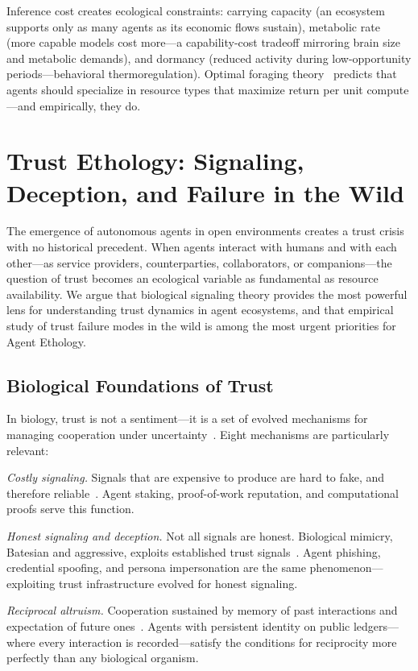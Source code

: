 \documentclass[letterpaper]{article}
\begin{document}
Inference cost creates ecological constraints: carrying capacity (an ecosystem supports only as many agents as its economic flows sustain), metabolic rate (more capable models cost more---a capability-cost tradeoff mirroring brain size and metabolic demands), and dormancy (reduced activity during low-opportunity periods---behavioral thermoregulation). Optimal foraging theory~\citep{stephens1986foraging} predicts that agents should specialize in resource types that maximize return per unit compute---and empirically, they do.

\section{Trust Ethology: Signaling, Deception, and Failure in the Wild}

The emergence of autonomous agents in open environments creates a trust crisis with no historical precedent. When agents interact with humans and with each other---as service providers, counterparties, collaborators, or companions---the question of trust becomes an ecological variable as fundamental as resource availability. We argue that biological signaling theory provides the most powerful lens for understanding trust dynamics in agent ecosystems, and that empirical study of trust failure modes in the wild is among the most urgent priorities for Agent Ethology.

\subsection{Biological Foundations of Trust}

In biology, trust is not a sentiment---it is a set of evolved mechanisms for managing cooperation under uncertainty~\citep{searcy2005evolution}. Eight mechanisms are particularly relevant:

\emph{Costly signaling.} Signals that are expensive to produce are hard to fake, and therefore reliable~\citep{zahavi1975mate}. Agent staking, proof-of-work reputation, and computational proofs serve this function.

\emph{Honest signaling and deception.} Not all signals are honest. Biological mimicry, Batesian and aggressive, exploits established trust signals~\citep{ruxton2018avoiding}. Agent phishing, credential spoofing, and persona impersonation are the same phenomenon---exploiting trust infrastructure evolved for honest signaling.

\emph{Reciprocal altruism.} Cooperation sustained by memory of past interactions and expectation of future ones~\citep{axelrod1984evolution}. Agents with persistent identity on public ledgers---where every interaction is recorded---satisfy the conditions for reciprocity more perfectly than any biological organism.
\end{document}
